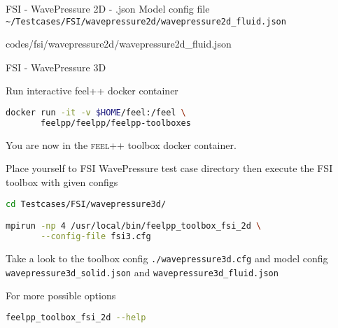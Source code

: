 \begin{frame}{FSI - WavePressure 2D - .json}
Model config file \lstinline{~/Testcases/FSI/wavepressure2d/wavepressure2d_fluid.json}
\vspace{5mm}

{codes/fsi/wavepressure2d/wavepressure2d_fluid.json}
\end{frame}









\begin{frame}{FSI - WavePressure 3D}

Run  interactive feel++ docker container

\begin{lstlisting}[language=Bash,mathescape=false,emph={docker}]
docker run -it -v $HOME/feel:/feel \
       feelpp/feelpp/feelpp-toolboxes 
\end{lstlisting}

You are now in the \textsc{feel++} toolbox docker container.

Place yourself to FSI WavePressure test case directory then execute the
FSI toolbox with given configs

\begin{lstlisting}[language=Bash,mathescape=false, emph={feelpp_toolbox_fsi_2d}]
cd Testcases/FSI/wavepressure3d/

mpirun -np 4 /usr/local/bin/feelpp_toolbox_fsi_2d \
       --config-file fsi3.cfg
\end{lstlisting}

Take a look to the toolbox config \lstinline{./wavepressure3d.cfg} and model config
\lstinline{wavepressure3d_solid.json} and \lstinline{wavepressure3d_fluid.json}

For more possible options
\begin{lstlisting}[language=Bash,mathescape=false, emph={feelpp_toolbox_fsi_2d}]
feelpp_toolbox_fsi_2d --help
\end{lstlisting}

\end{frame}


